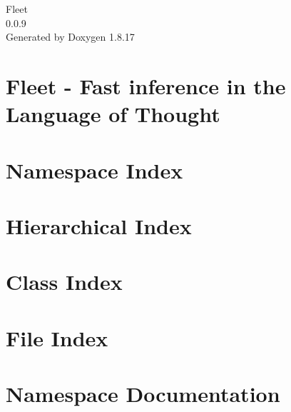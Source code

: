 \let\mypdfximage\pdfximage\def\pdfximage{\immediate\mypdfximage}\documentclass[twoside]{book}
\newcommand{\+}{\discretionary{\mbox{\scriptsize$\hookleftarrow$}}{}{}}
\newcommand{\clearemptydoublepage}{%
  \newpage{\pagestyle{empty}\cleardoublepage}%
}
\begin{document}
\hypersetup{pageanchor=false,
             bookmarksnumbered=true,
             pdfencoding=unicode
            }
\begin{titlepage}
\vspace*{7cm}
\begin{center}%
{\Large Fleet \\[1ex]\large 0.\+0.\+9 }\\
\vspace*{1cm}
{\large Generated by Doxygen 1.8.17}\\
\end{center}
\end{titlepage}
\clearemptydoublepage
{}
\tableofcontents
\clearemptydoublepage
{}
\hypersetup{pageanchor=true}

\chapter{Fleet -\/ Fast inference in the Language of Thought}
\label{index}\hypertarget{index}{}
\chapter{Namespace Index}

\chapter{Hierarchical Index}

\chapter{Class Index}

\chapter{File Index}

\chapter{Namespace Documentation}





\end{document}

